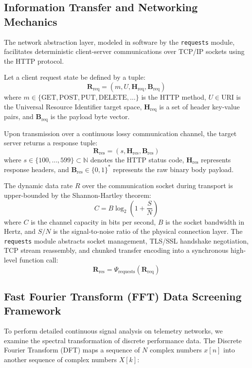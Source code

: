 \documentclass{article}
\begin{document}
\subsection{Information Transfer and Networking Mechanics}
The network abstraction layer, modeled in software by the \texttt{requests} module, facilitates deterministic client-server communications over TCP/IP sockets using the HTTP protocol. 

Let a client request state be defined by a tuple:
\begin{equation}
\mathbf{R}_{\text{req}} = \left( m, U, \mathbf{H}_{\text{req}}, \mathbf{B}_{\text{req}} \right)
\end{equation}
where $m \in \{\text{GET}, \text{POST}, \text{PUT}, \text{DELETE}, \dots\}$ is the HTTP method, $U \in \text{URI}$ is the Universal Resource Identifier target space, $\mathbf{H}_{\text{req}}$ is a set of header key-value pairs, and $\mathbf{B}_{\text{req}}$ is the payload byte vector.

Upon transmission over a continuous lossy communication channel, the target server returns a response tuple:
\begin{equation}
\mathbf{R}_{\text{res}} = \left( s, \mathbf{H}_{\text{res}}, \mathbf{B}_{\text{res}} \right)
\end{equation}
where $s \in \{100, \dots, 599\} \subset \mathbb{N}$ denotes the HTTP status code, $\mathbf{H}_{\text{res}}$ represents response headers, and $\mathbf{B}_{\text{res}} \in \{0, 1\}^*$ represents the raw binary body payload.

The dynamic data rate $R$ over the communication socket during transport is upper-bounded by the Shannon-Hartley theorem:
\begin{equation}
C = B \log_2 \left( 1 + \frac{S}{N} \right)
\end{equation}
where $C$ is the channel capacity in bits per second, $B$ is the socket bandwidth in Hertz, and $S/N$ is the signal-to-noise ratio of the physical connection layer. The \texttt{requests} module abstracts socket management, TLS/SSL handshake negotiation, TCP stream reassembly, and chunked transfer encoding into a synchronous high-level function call:
\begin{equation}
\mathbf{R}_{\text{res}} = \Psi_{\text{requests}}\left( \mathbf{R}_{\text{req}} \right)
\end{equation}

\subsection{Fast Fourier Transform (FFT) Data Screening Framework}
To perform detailed continuous signal analysis on telemetry networks, we examine the spectral transformation of discrete performance data. The Discrete Fourier Transform (DFT) maps a sequence of $N$ complex numbers $x[n]$ into another sequence of complex numbers $X[k]$:
\end{document}
